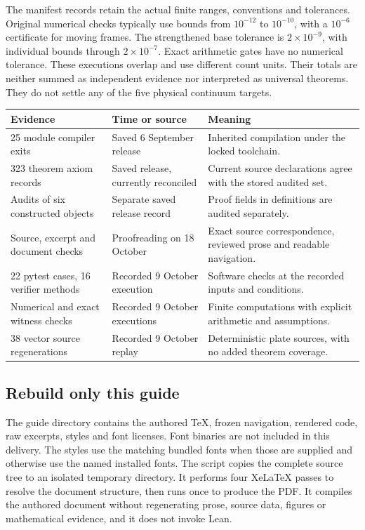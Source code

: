 The manifest records retain the actual finite ranges, conventions and tolerances. Original numerical checks typically use bounds from $10^{-12}$ to $10^{-10}$, with a $10^{-6}$ certificate for moving frames. The strengthened base tolerance is $2\times10^{-9}$, with individual bounds through $2\times10^{-7}$. Exact arithmetic gates have no numerical tolerance. These executions overlap and use different count units. Their totals are neither summed as independent evidence nor interpreted as universal theorems. They do not settle any of the five physical continuum targets.

\begin{longtable}{@{}p{.31\linewidth}p{.30\linewidth}p{.32\linewidth}@{}}
\toprule Evidence & Time or source & Meaning\\\midrule\endhead
25 module compiler exits & Saved 6 September release & Inherited compilation under the locked toolchain.\\
323 theorem axiom records & Saved release, currently reconciled & Current source declarations agree with the stored audited set.\\
Audits of six constructed objects & Separate saved release record & Proof fields in definitions are audited separately.\\
Source, excerpt and document checks & Proofreading on 18 October & Exact source correspondence, reviewed prose and readable navigation.\\
22 pytest cases, 16 verifier methods & Recorded 9 October execution & Software checks at the recorded inputs and conditions.\\
Numerical and exact witness checks & Recorded 9 October executions & Finite computations with explicit arithmetic and assumptions.\\
38 vector source regenerations & Recorded 9 October replay & Deterministic plate sources, with no added theorem coverage.\\
\bottomrule\end{longtable}

\subsection{Rebuild only this guide}
The guide directory contains the authored TeX, frozen navigation, rendered code, raw excerpts, styles and font licenses. Font binaries are not included in this delivery. The styles use the matching bundled fonts when those are supplied and otherwise use the named installed fonts. The script  copies the complete source tree to an isolated temporary directory. It performs four XeLaTeX passes to resolve the document structure, then runs  once to produce the PDF. It compiles the authored document without regenerating prose, source data, figures or mathematical evidence, and it does not invoke Lean.

